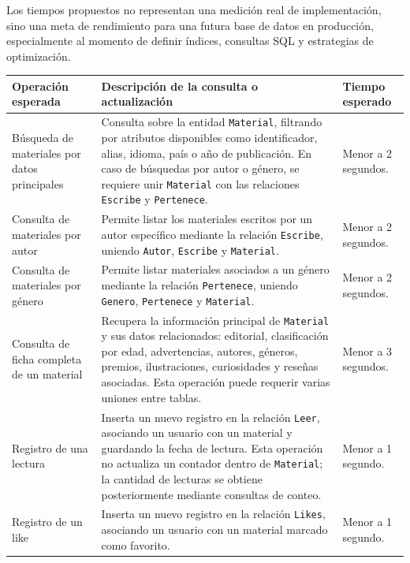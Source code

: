 \documentclass[12pt,a4paper]{article}
\begin{document}
Los tiempos propuestos no representan una medición real de implementación, sino una meta de rendimiento para una futura base de datos en producción, especialmente al momento de definir índices, consultas SQL y estrategias de optimización.

\begin{longtable}{p{4.5cm} p{6.5cm} p{3cm}}
\toprule
\textbf{Operación esperada} & \textbf{Descripción de la consulta o actualización} & \textbf{Tiempo esperado} \\
\midrule
\endhead

Búsqueda de materiales por datos principales & Consulta sobre la entidad \texttt{Material}, filtrando por atributos disponibles como identificador, alias, idioma, país o año de publicación. En caso de búsquedas por autor o género, se requiere unir \texttt{Material} con las relaciones \texttt{Escribe} y \texttt{Pertenece}. & Menor a 2 segundos. \\

Consulta de materiales por autor & Permite listar los materiales escritos por un autor específico mediante la relación \texttt{Escribe}, uniendo \texttt{Autor}, \texttt{Escribe} y \texttt{Material}. & Menor a 2 segundos. \\

Consulta de materiales por género & Permite listar materiales asociados a un género mediante la relación \texttt{Pertenece}, uniendo \texttt{Genero}, \texttt{Pertenece} y \texttt{Material}. & Menor a 2 segundos. \\

Consulta de ficha completa de un material & Recupera la información principal de \texttt{Material} y sus datos relacionados: editorial, clasificación por edad, advertencias, autores, géneros, premios, ilustraciones, curiosidades y reseñas asociadas. Esta operación puede requerir varias uniones entre tablas. & Menor a 3 segundos. \\

Registro de una lectura & Inserta un nuevo registro en la relación \texttt{Leer}, asociando un usuario con un material y guardando la fecha de lectura. Esta operación no actualiza un contador dentro de \texttt{Material}; la cantidad de lecturas se obtiene posteriormente mediante consultas de conteo. & Menor a 1 segundo. \\

Registro de un like & Inserta un nuevo registro en la relación \texttt{Likes}, asociando un usuario con un material marcado como favorito. & Menor a 1 segundo. \\


\end{longtable}
\end{document}
